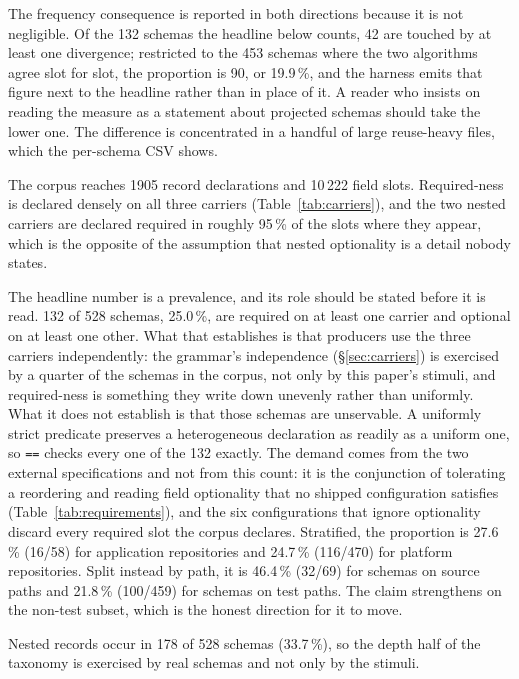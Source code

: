 The frequency consequence is reported in both directions because it is not negligible. Of the 132 schemas the headline below counts, 42 are touched by at least one divergence; restricted to the 453 schemas where the two algorithms agree slot for slot, the proportion is 90, or 19.9\,\%, and the harness emits that figure next to the headline rather than in place of it. A reader who insists on reading the measure as a statement about projected schemas should take the lower one. The difference is concentrated in a handful of large reuse-heavy files, which the per-schema CSV shows.

The corpus reaches 1905 record declarations and 10\,222 field slots. Required-ness is declared densely on all three carriers (Table~\ref{tab:carriers}), and the two nested carriers are declared required in roughly 95\,\% of the slots where they appear, which is the opposite of the assumption that nested optionality is a detail nobody states.

The headline number is a prevalence, and its role should be stated before it is read. 132 of 528 schemas, 25.0\,\%, are required on at least one carrier and optional on at least one other. What that establishes is that producers use the three carriers independently: the grammar's independence (\S\ref{sec:carriers}) is exercised by a quarter of the schemas in the corpus, not only by this paper's stimuli, and required-ness is something they write down unevenly rather than uniformly. What it does not establish is that those schemas are unservable. A uniformly strict predicate preserves a heterogeneous declaration as readily as a uniform one, so \texttt{==} checks every one of the 132 exactly. The demand comes from the two external specifications and not from this count: it is the conjunction of tolerating a reordering and reading field optionality that no shipped configuration satisfies (Table~\ref{tab:requirements}), and the six configurations that ignore optionality discard every required slot the corpus declares. Stratified, the proportion is 27.6\,\% (16/58) for application repositories and 24.7\,\% (116/470) for platform repositories. Split instead by path, it is 46.4\,\% (32/69) for schemas on source paths and 21.8\,\% (100/459) for schemas on test paths. The claim strengthens on the non-test subset, which is the honest direction for it to move.

Nested records occur in 178 of 528 schemas (33.7\,\%), so the depth half of the taxonomy is exercised by real schemas and not only by the stimuli.

